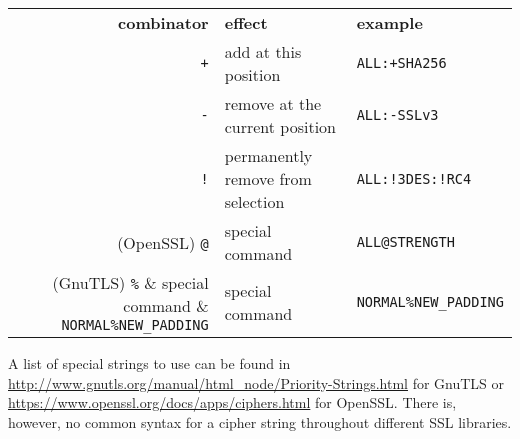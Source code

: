 \begin{center}
\begin{tabular}{rll}
\toprule
\textbf{combinator} & \textbf{effect}                   & \textbf{example}\\\cmidrule(lr){1-3}
           \verb|+| & add at this position              & \verb|ALL:+SHA256|        \\
           \verb|-| & remove at the current position    & \verb|ALL:-SSLv3|         \\
           \verb|!| & permanently remove from selection & \verb|ALL:!3DES:!RC4|     \\
 (OpenSSL) \verb|@| & special command                   & \verb|ALL@STRENGTH|       \\
  (GnuTLS) \verb|%| & special command                   & \verb|NORMAL%NEW_PADDING| \\
\bottomrule
\end{tabular}
\end{center}

A list of special strings to use can be found in
\url{http://www.gnutls.org/manual/html_node/Priority-Strings.html} for GnuTLS or
\url{https://www.openssl.org/docs/apps/ciphers.html} for OpenSSL. There is, however, no
common syntax for a cipher string throughout different SSL libraries.
